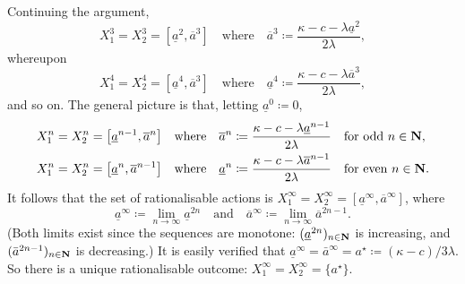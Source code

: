 \begin{example}
	Continuing the argument,
	\begin{equation*}
		X^3_1 = X^3_2
		= \left[ \underline{a}^2, \overline{a}^3 \right]
		\quad \text{where} \quad
		\overline{a}^3 \coloneqq \frac{ \kappa - c - \lambda \underline{a}^2 }{ 2 \lambda } ,
	\end{equation*}
	whereupon
	\begin{equation*}
		X^4_1 = X^4_2
		= \left[ \underline{a}^4, \overline{a}^3 \right]
		\quad \text{where} \quad
		\underline{a}^4 \coloneqq \frac{ \kappa - c - \lambda \overline{a}^3 }{ 2 \lambda } ,
	\end{equation*}
	and so on. The general picture is that, letting $\underline{a}^0 \coloneqq 0$,
	\begin{align*}
		X^n_1 = X^n_2
		&= \left[ \underline{a}^{n-1}, \overline{a}^n \right]
		\quad \text{where} \quad
		\overline{a}^n \coloneqq \frac{ \kappa - c - \lambda \underline{a}^{n-1} }{ 2 \lambda }
		\quad \text{for odd $n \in \N$,}
		\\
		X^n_1 = X^n_2
		&= \left[ \underline{a}^n, \overline{a}^{n-1} \right]
		\quad \text{where} \quad
		\underline{a}^n \coloneqq \frac{ \kappa - c - \lambda \overline{a}^{n-1} }{ 2 \lambda }
		\quad \text{for even $n \in \N$.}
	\end{align*}
	It follows that the set of rationalisable actions is $X^\infty_1 = X^\infty_2 = \left[ \underline{a}^\infty, \overline{a}^\infty \right]$, where
	\begin{equation*}
		\underline{a}^\infty
		\coloneqq \lim_{n \to \infty}
		\underline{a}^{2n}
		\quad \text{and} \quad
		\overline{a}^\infty
		\coloneqq \lim_{n \to \infty}
		\overline{a}^{2n-1} .
	\end{equation*}
	(Both limits exist since the sequences are monotone: $(\underline{a}^{2n})_{n \in \mathbf{N}}$ is increasing, and $(\bar{a}^{2n-1})_{n \in \mathbf{N}}$ is decreasing.) It is easily verified that $\underline{a}^\infty = \bar{a}^\infty = a^\star \coloneqq (\kappa-c)/3\lambda$. So there is a unique rationalisable outcome: $X^\infty_1 = X^\infty_2 = \{a^\star\}$.
\end{example}


